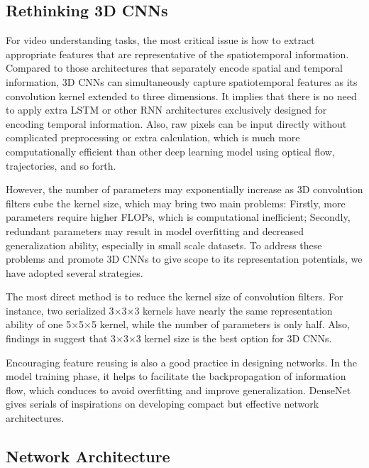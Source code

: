 \documentclass[10pt,twocolumn,letterpaper]{article}
\begin{document}
\subsection{Rethinking 3D CNNs}

For video understanding tasks, the most critical issue is how to extract appropriate features that are representative of the spatiotemporal information.
Compared to those architectures that separately encode spatial and temporal information, 3D CNNs can simultaneously capture spatiotemporal features as its convolution kernel extended to three dimensions. 
It implies that there is no need to apply extra LSTM or other RNN architectures exclusively designed for encoding temporal information. 
Also, raw pixels can be input directly without complicated preprocessing or extra calculation, which is much more computationally efficient than other deep learning model using optical flow, trajectories, and so forth.

However, the number of parameters may  exponentially increase as 3D convolution filters cube the kernel size, which may bring two main problems: 
Firstly, more parameters require higher FLOPs, which is computational inefficient; 
Secondly, redundant parameters may result in model overfitting and decreased generalization ability, especially in small scale datasets. 
To address these problems and promote 3D CNNs to give scope to its representation potentials, we have adopted several strategies.

The most direct method is to reduce the kernel size of convolution filters. 
For instance, two serialized 3$\times$3$\times$3 kernels have nearly the same representation ability of one 5$\times$5$\times$5 kernel, while the number of parameters is only half. 
Also, findings in \cite{3dcnn_1, 3dcnn_2, r2+1d} suggest that 3$\times$3$\times$3 kernel size is the best option for 3D CNNs.

Encouraging feature reusing is also a good practice in designing networks. 
In the model training phase, it helps to facilitate the backpropagation of information flow, which conduces to avoid overfitting and improve generalization. 
DenseNet \cite{densenet} gives serials of inspirations on developing compact but effective network architectures.

\subsection{Network Architecture}
\end{document}
